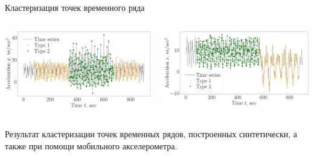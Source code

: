 \documentclass[10pt,pdf,hyperref={unicode}]{beamer}
\begin{document}
\begin{frame}[shrink=5]{Кластеризация точек временного ряда}
\begin{columns}
    \begin{column}{0.5\textwidth}
        \includegraphics[width=1\textwidth]{results/real_1_claster_vector}
    \end{column}
    \begin{column}{0.5\textwidth}
        \includegraphics[width=1\textwidth]{results/real_2_claster_vector}
    \end{column}
\end{columns}

Результат кластеризации точек временных рядов, построенных синтетически, а также при помощи мобильного акселерометра.

\end{frame}
\end{document}
